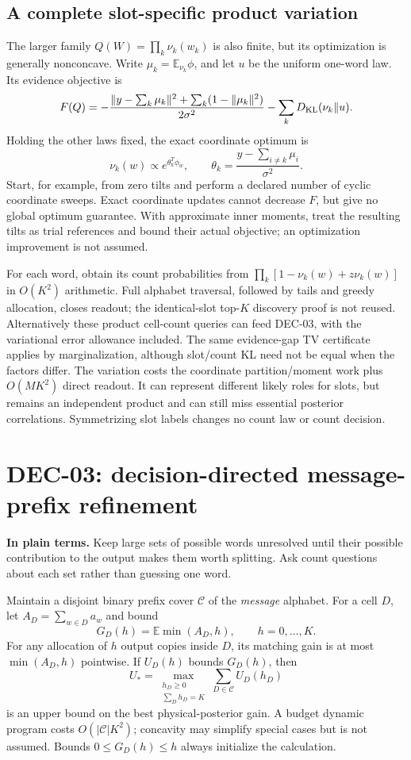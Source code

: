 \documentclass[10pt,a4paper]{article}
\newcommand{\E}{\mathbb E}
\newcommand{\KL}{D_{\rm KL}}
\begin{document}
\subsection{A complete slot-specific product variation}
The larger family $Q(W)=\prod_k\nu_k(w_k)$ is also finite, but its optimization is generally nonconcave.
Write $\mu_k=\E_{\nu_k}\phi$, and let $u$ be the uniform one-word law. Its evidence objective is
\[
 F(Q)=-\frac{\|y-\sum_k\mu_k\|^2+\sum_k(1-\|\mu_k\|^2)}{2\sigma^2}
              -\sum_k\KL(\nu_k\|u).
\]
Holding the other laws fixed, the exact coordinate optimum is
\[
 \nu_k(w)\propto e^{\theta_k^T\phi_w},\qquad
 \theta_k=\frac{y-\sum_{i\ne k}\mu_i}{\sigma^2}.
\]
Start, for example, from zero tilts and perform a declared number of cyclic coordinate sweeps.
Exact coordinate updates cannot decrease $F$, but give no global optimum guarantee.
With approximate inner moments, treat the resulting tilts as trial references and bound their actual
objective; an optimization improvement is not assumed.

For each word, obtain its count probabilities from
$\prod_k[1-\nu_k(w)+z\nu_k(w)]$ in $O(K^2)$ arithmetic.
Full alphabet traversal, followed by tails and greedy allocation, closes readout; the identical-slot
top-$K$ discovery proof is not reused. Alternatively these product cell-count queries can feed DEC-03,
with the variational error allowance included. The same evidence-gap TV certificate applies by
marginalization, although slot/count KL need not be equal when the factors differ.
The variation costs the coordinate partition/moment work plus $O(MK^2)$ direct readout.
It can represent different likely roles for slots, but remains an independent product and can still miss
essential posterior correlations. Symmetrizing slot labels changes no count law or count decision.

\clearpage
\section{DEC-03: decision-directed message-prefix refinement}
\label{sec:prefix}
\textbf{In plain terms.} Keep large sets of possible words unresolved until their possible contribution
to the output makes them worth splitting. Ask count questions about each set rather than guessing one word.

Maintain a disjoint binary prefix cover $\mathcal C$ of the \emph{message} alphabet. For a cell $D$,
let $A_D=\sum_{w\in D}a_w$ and bound
\[
 G_D(h)=\E\min(A_D,h),\qquad h=0,\ldots,K.
\]
For any allocation of $h$ output copies inside $D$, its matching gain is at most $\min(A_D,h)$
pointwise. If $U_D(h)$ bounds $G_D(h)$, then
\begin{equation}
 U_*=\max_{\substack{h_D\geq0\\\sum_Dh_D=K}}\sum_{D\in\mathcal C}U_D(h_D)
 \label{eq:prefix-upper}
\end{equation}
is an upper bound on the best physical-posterior gain. A budget dynamic program costs
$O(|\mathcal C|K^2)$; concavity may simplify special cases but is not assumed.
Bounds $0\leq G_D(h)\leq h$ always initialize the calculation.
\end{document}

